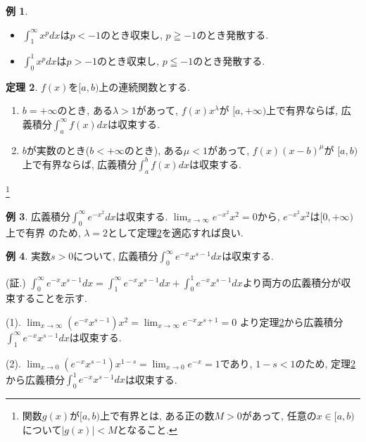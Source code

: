 \documentclass[dvipdfmx,a4paper,11pt]{article}
\theoremstyle{definition}
\newtheorem{thm}{定理}
\newtheorem{exa}[thm]{例}
\begin{document}
 \begin{exa}
 \begin{itemize}
 \item $\int_{1}^{\infty} x^p dx$は$p<-1$のとき収束し, $p \geqq -1$のとき発散する.
 \item $\int_{0}^{1} x^p dx$は$p>-1$のとき収束し, $p \leqq -1$のとき発散する.

 \end{itemize}
 \end{exa}
 
 
  \begin{tcolorbox}[
    colback = white,
    colframe = green!35!black,
    fonttitle = \bfseries,
    breakable = true]
    \begin{thm}
    \label{kougi}
$f(x)$を$[a,b)$上の連続関数とする.
\begin{enumerate}
\item $b=+ \infty$のとき, ある$\lambda >1$があって, $f(x)x^{\lambda}$が
$[a, +\infty)$上で有界ならば, 広義積分$\int_{a}^{\infty} f(x)dx $は収束する.
\item $b$が実数のとき($b <+ \infty$のとき), ある$\mu <1$があって, $f(x)(x-b)^{\mu}$が
$[a, b)$上で有界ならば, 広義積分$\int_{a}^{b} f(x)dx $は収束する.
\end{enumerate}
 \end{thm}
 \end{tcolorbox}
 \footnote{関数$g(x)$が$[a, b)$上で有界とは, ある正の数$M>0$があって, 任意の$x \in [a, b)$について$|g(x)| < M$となること.}
 
 \begin{exa}
広義積分$\int_{0}^{\infty} e^{-x^2}dx $は収束する.
$\lim_{x \rightarrow \infty}e^{-x^2}x^{2} =0$から, $e^{-x^2}x^{2} $は$[0, +\infty)$上で有界
のため, $\lambda=2$として定理\ref{kougi}を適応すれば良い.

 \end{exa}
  \begin{exa}
実数$s>0$について, 広義積分$\int_{0}^{\infty} e^{-x}x^{s-1}dx $は収束する.

\hspace{-18pt}(証.)
$\int_{0}^{\infty} e^{-x}x^{s-1}dx = \int_{1}^{\infty} e^{-x}x^{s-1}dx+\int_{0}^{1} e^{-x}x^{s-1}dx$より両方の広義積分が収束することを示す.

\hspace{-18pt}(1). $\lim_{x \rightarrow \infty} (e^{-x}x^{s-1}) x^{2} = \lim_{x \rightarrow \infty} e^{-x}x^{s+1} =0$
より定理\ref{kougi}から広義積分$\int_{1}^{\infty} e^{-x}x^{s-1}dx$は収束する.

\hspace{-18pt}(2). $\lim_{x \rightarrow 0} (e^{-x}x^{s-1}) x^{1-s} =\lim_{x \rightarrow 0} e^{-x} =1$であり, $1-s<1$のため, 定理\ref{kougi}から広義積分$\int_{0}^{1} e^{-x}x^{s-1} dx$は収束する.
 \end{exa}
\end{document}
